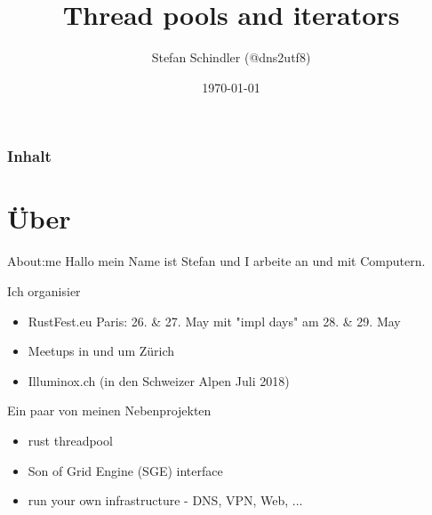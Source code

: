 \documentclass[aspectratio=1610,t]{beamer}
\title{Thread pools and iterators}
\date{\today}
\author{Stefan Schindler (@dns2utf8)}
\institute{Rust Zürichsee, Schweiz CH - @Cosin 2018}
\begin{document}

\maketitle


\begin{frame}
	\frametitle{Inhalt}
	\setcounter{tocdepth}{1}
	\tableofcontents
\end{frame}



{
\section{Über}
}



\begin{frame}[fragile]{About:me}
Hallo mein Name ist Stefan und I arbeite an und mit Computern.

Ich organisier
\begin{itemize}
  \item RustFest.eu Paris: 26. \& 27. May mit "impl days" am 28. \& 29. May
  \item Meetups in und um Zürich
  \item Illuminox.ch (in den Schweizer Alpen Juli 2018)
\end{itemize}

Ein paar von meinen Nebenprojekten
\begin{itemize}
  \item rust threadpool
  \item Son of Grid Engine (SGE) interface
  \item run your own infrastructure - DNS, VPN, Web, ...
\end{itemize}
\end{frame}
\end{document}
